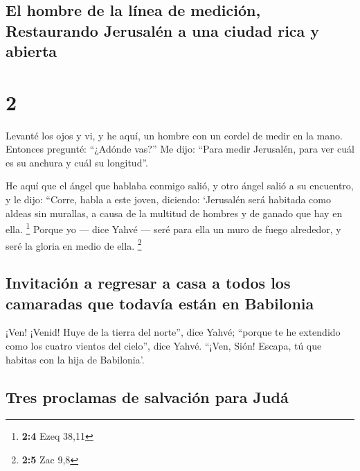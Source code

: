\hypertarget{el-hombre-de-la-luxednea-de-mediciuxf3n-restaurando-jerusaluxe9n-a-una-ciudad-rica-y-abierta}{%
\subsection{El hombre de la línea de medición, Restaurando Jerusalén a
una ciudad rica y
abierta}\label{el-hombre-de-la-luxednea-de-mediciuxf3n-restaurando-jerusaluxe9n-a-una-ciudad-rica-y-abierta}}

\hypertarget{section-1}{%
\section{2}\label{section-1}}

 Levanté los ojos y vi, y he aquí, un hombre con un cordel
de medir en la mano.  Entonces pregunté: ``¿Adónde vas?''
Me dijo: ``Para medir Jerusalén, para ver cuál es su anchura y cuál su
longitud''.

 He aquí que el ángel que hablaba conmigo salió, y otro
ángel salió a su encuentro,  y le dijo: ``Corre, habla a
este joven, diciendo: `Jerusalén será habitada como aldeas sin murallas,
a causa de la multitud de hombres y de ganado que hay en ella.
\footnote{\textbf{2:4} Ezeq 38,11}  Porque yo --- dice
Yahvé --- seré para ella un muro de fuego alrededor, y seré la gloria en
medio de ella. \footnote{\textbf{2:5} Zac 9,8}

\hypertarget{invitaciuxf3n-a-regresar-a-casa-a-todos-los-camaradas-que-todavuxeda-estuxe1n-en-babilonia}{%
\subsection{Invitación a regresar a casa a todos los camaradas que
todavía están en
Babilonia}\label{invitaciuxf3n-a-regresar-a-casa-a-todos-los-camaradas-que-todavuxeda-estuxe1n-en-babilonia}}

 ¡Ven! ¡Venid! Huye de la tierra del norte'', dice Yahvé;
``porque te he extendido como los cuatro vientos del cielo'', dice
Yahvé.  ``¡Ven, Sión! Escapa, tú que habitas con la hija
de Babilonia'.

\hypertarget{tres-proclamas-de-salvaciuxf3n-para-juduxe1}{%
\subsection{Tres proclamas de salvación para
Judá}\label{tres-proclamas-de-salvaciuxf3n-para-juduxe1}}

